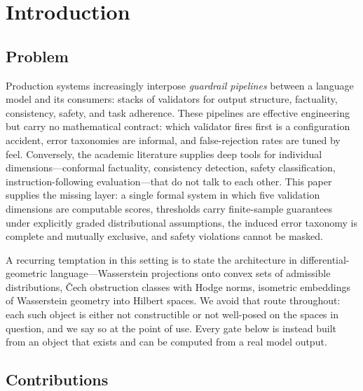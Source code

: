 \section{Introduction}

\subsection{Problem}

Production systems increasingly interpose \emph{guardrail pipelines} between a
language model and its consumers: stacks of validators for output structure,
factuality, consistency, safety, and task adherence. These pipelines are
effective engineering but carry no mathematical contract: which validator fires
first is a configuration accident, error taxonomies are informal, and
false-rejection rates are tuned by feel. Conversely, the academic literature
supplies deep tools for individual dimensions---conformal factuality,
consistency detection, safety classification, instruction-following
evaluation---that do not talk to each other. This paper supplies the missing
layer: a single formal system in which five validation dimensions are
computable scores, thresholds carry finite-sample guarantees under explicitly
graded distributional assumptions, the induced error taxonomy is complete and
mutually exclusive, and safety violations cannot be masked.

A recurring temptation in this setting is to state the architecture in
differential-geometric language---Wasserstein projections onto convex sets of
admissible distributions, \v{C}ech obstruction classes with Hodge norms,
isometric embeddings of Wasserstein geometry into Hilbert spaces. We avoid
that route throughout: each such object is either not constructible or not
well-posed on the spaces in question, and we say so at the point of use. Every
gate below is instead built from an object that exists and can be computed
from a real model output.

\subsection{Contributions}

